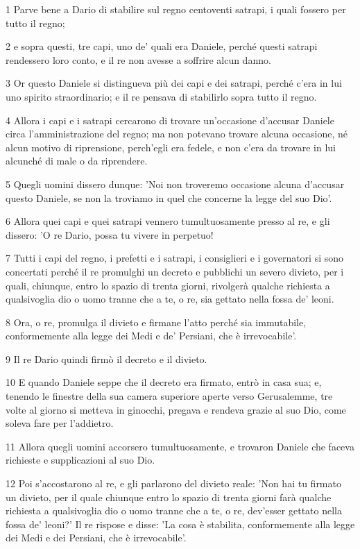 \par 1 Parve bene a Dario di stabilire sul regno centoventi satrapi, i quali fossero per tutto il regno;
\par 2 e sopra questi, tre capi, uno de' quali era Daniele, perché questi satrapi rendessero loro conto, e il re non avesse a soffrire alcun danno.
\par 3 Or questo Daniele si distingueva più dei capi e dei satrapi, perché c'era in lui uno spirito straordinario; e il re pensava di stabilirlo sopra tutto il regno.
\par 4 Allora i capi e i satrapi cercarono di trovare un'occasione d'accusar Daniele circa l'amministrazione del regno; ma non potevano trovare alcuna occasione, né alcun motivo di riprensione, perch'egli era fedele, e non c'era da trovare in lui alcunché di male o da riprendere.
\par 5 Quegli uomini dissero dunque: 'Noi non troveremo occasione alcuna d'accusar questo Daniele, se non la troviamo in quel che concerne la legge del suo Dio'.
\par 6 Allora quei capi e quei satrapi vennero tumultuosamente presso al re, e gli dissero: 'O re Dario, possa tu vivere in perpetuo!
\par 7 Tutti i capi del regno, i prefetti e i satrapi, i consiglieri e i governatori si sono concertati perché il re promulghi un decreto e pubblichi un severo divieto, per i quali, chiunque, entro lo spazio di trenta giorni, rivolgerà qualche richiesta a qualsivoglia dio o uomo tranne che a te, o re, sia gettato nella fossa de' leoni.
\par 8 Ora, o re, promulga il divieto e firmane l'atto perché sia immutabile, conformemente alla legge dei Medi e de' Persiani, che è irrevocabile'.
\par 9 Il re Dario quindi firmò il decreto e il divieto.
\par 10 E quando Daniele seppe che il decreto era firmato, entrò in casa sua; e, tenendo le finestre della sua camera superiore aperte verso Gerusalemme, tre volte al giorno si metteva in ginocchi, pregava e rendeva grazie al suo Dio, come soleva fare per l'addietro.
\par 11 Allora quegli uomini accorsero tumultuosamente, e trovaron Daniele che faceva richieste e supplicazioni al suo Dio.
\par 12 Poi s'accostarono al re, e gli parlarono del divieto reale: 'Non hai tu firmato un divieto, per il quale chiunque entro lo spazio di trenta giorni farà qualche richiesta a qualsivoglia dio o uomo tranne che a te, o re, dev'esser gettato nella fossa de' leoni?' Il re rispose e disse: 'La cosa è stabilita, conformemente alla legge dei Medi e dei Persiani, che è irrevocabile'.
